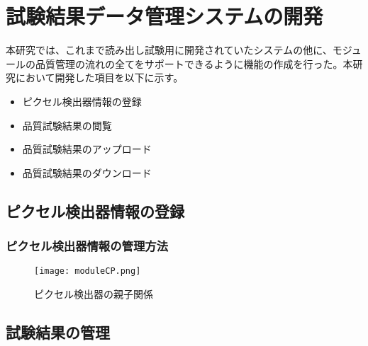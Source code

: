 \chapter{試験結果データ管理システムの開発}
\label{sec:}

本研究では、これまで読み出し試験用に開発されていたシステムの他に、モジュールの品質管理の流れの全てをサポートできるように機能の作成を行った。本研究において開発した項目を以下に示す。
\begin{itemize}
  \item ピクセル検出器情報の登録
  \item 品質試験結果の閲覧
  \item 品質試験結果のアップロード
  \item 品質試験結果のダウンロード
\end{itemize}

\section{ピクセル検出器情報の登録}
\label{sec:register-module}


\subsection{ピクセル検出器情報の管理方法}
\label{sec:register-module}

\begin{figure}[tbp]
  \centering
  \texttt{[image: moduleCP.png]}
  \caption[ピクセル検出器の親子関係]{ピクセル検出器の親子関係}
  \label{fig:moduleCP}
\end{figure}

\section{試験結果の管理}
\label{sec:show-nonelec}




